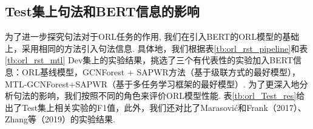 \subsection{Test集上句法和BERT信息的影响}
为了进一步探究句法对于ORL任务的作用, 我们在引入BERT的ORL模型的基础上，采用相同的方法引入句法信息.
具体地，我们根据表\ref{tb:orl_rst_pipeline}和表\ref{tb:orl_rst_mtl} Dev集上的实验结果，挑选了三个有代表性的实验加入BERT信息：ORL基线模型，GCNForest + SAPWR方法（基于级联方式的最好模型），MTL-GCNForest+SAPWR（基于多任务学习框架的最好模型）.
为了更深入地分析句法的影响，我们按照不同的角色来评价ORL模型性能.
表\ref{tb:orl_Test_res}给出了Test集上相关实验的F1值，此外，我们还对比了Marasovi{\'c}和Frank（2017）、Zhang等（2019）的实验结果.

